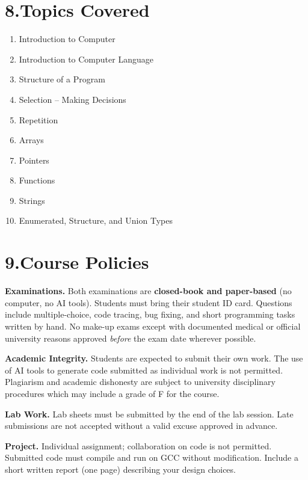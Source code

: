 \documentclass[11pt,a4paper]{article}
\begin{document}
\section*{8.\quad Topics Covered}
\begin{enumerate}[label=\alph*.]
  \item Introduction to Computer
  \item Introduction to Computer Language
  \item Structure of a Program
  \item Selection -- Making Decisions
  \item Repetition
  \item Arrays
  \item Pointers
  \item Functions
  \item Strings
  \item Enumerated, Structure, and Union Types
\end{enumerate}

\section*{9.\quad Course Policies}

\noindent\textbf{Examinations.}
Both examinations are \textbf{closed-book and paper-based} (no computer, no AI tools).
Students must bring their student ID card.
Questions include multiple-choice, code tracing, bug fixing, and short
programming tasks written by hand.
No make-up exams except with documented medical or official university reasons
approved \emph{before} the exam date wherever possible.

\medskip
\noindent\textbf{Academic Integrity.}
Students are expected to submit their own work.
The use of AI tools to generate code submitted as individual work is not permitted.
Plagiarism and academic dishonesty are subject to university disciplinary
procedures which may include a grade of F for the course.

\medskip
\noindent\textbf{Lab Work.}
Lab sheets must be submitted by the end of the lab session.
Late submissions are not accepted without a valid excuse approved in advance.

\medskip
\noindent\textbf{Project.}
Individual assignment; collaboration on code is not permitted.
Submitted code must compile and run on GCC without modification.
Include a short written report (one page) describing your design choices.
\end{document}
